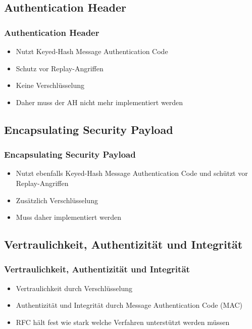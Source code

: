 \documentclass[t]{beamer}
\begin{document}
\subsection*{Authentication Header}
\begin{frame}
	\frametitle{Authentication Header}
	\begin{itemize}
		\vfill
		\item Nutzt Keyed-Hash Message Authentication Code
		\vfill
		\item Schutz vor Replay-Angriffen
		\vfill
		\item Keine Verschlüsselung
		\vfill
		\item Daher muss der AH nicht mehr implementiert werden
		\vfill
	\end{itemize}
\end{frame}

\subsection*{Encapsulating Security Payload}
\begin{frame}
	\frametitle{Encapsulating Security Payload}
	\begin{itemize}
		\vfill
		\item Nutzt ebenfalls Keyed-Hash Message Authentication Code und schützt vor Replay-Angriffen
		\vfill
		\item Zusätzlich Verschlüsselung
		\vfill
		\item Muss daher implementiert werden
		\vfill
	\end{itemize}
\end{frame}

\subsection*{Vertraulichkeit, Authentizität und Integrität}
\begin{frame}
	\frametitle{Vertraulichkeit, Authentizität und Integrität}
	\begin{itemize}
		\vfill
		\item Vertraulichkeit durch Verschlüsselung
		\vfill
		\item Authentizität und Integrität durch Message Authentication Code (MAC)
		\vfill
		\item RFC hält fest wie stark welche Verfahren unterstützt werden müssen
		\vfill
	\end{itemize}
\end{frame}
\end{document}
